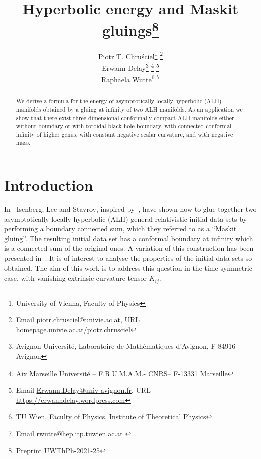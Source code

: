 \documentclass[a4paper,10pt]{article}
\newcounter{mnotecount}[section]
\renewcommand{\themnotecount}{\thesection.\arabic{mnotecount}}
\newcommand{\mnote}[1]%
{\protect{\stepcounter{mnotecount}}$^{\mbox{\footnotesize
$%
\bullet$\themnotecount}}$ \marginpar{%
\raggedright\tiny\em
$\!\!\!\!\!\!\,\bullet$\themnotecount: #1} }
\newcommand{\ptc}[1]{\mnote{{\bf ptc:}#1}}
\begin{document}
\title{Hyperbolic energy and Maskit gluings\protect\thanks{Preprint UWThPh-2021-25}}

\author{Piotr T. Chru\'{s}ciel\thanks{University of Vienna, Faculty of Physics} \thanks{
{\sc Email} \protect\url{piotr.chrusciel@univie.ac.at}, {\sc URL} \protect\url{homepage.univie.ac.at/piotr.chrusciel}}
\\
{Erwann
Delay}\thanks{ Avignon Universit\'e, Laboratoire de Math\'ematiques d'Avignon,
F-84916 Avignon}
\thanks{Aix Marseille Universit\'e -- F.R.U.M.A.M.- CNRS-- F-13331 Marseille}
 \thanks{{\sc Email} \protect\url{Erwann.Delay@univ-avignon.fr}, {\sc URL} \protect\url{https://erwanndelay.wordpress.com}}
\\
{Raphaela Wutte}\thanks{TU Wien, Faculty of Physics, Institute of Theoretical Physics}
\thanks{
{\sc Email} \protect\url{rwutte@hep.itp.tuwien.ac.at} {} \protect\url{}}
}
\maketitle

\begin{abstract}
We derive a formula for the energy of asymptotically locally hyperbolic
(ALH) manifolds obtained by a gluing at infinity of two ALH manifolds. As
an application we show that there exist three-dimensional conformally compact ALH manifolds
 either without boundary or with toroidal black hole boundary,
 with connected conformal infinity of higher genus, with constant negative scalar curvature, and
with negative mass.
\end{abstract}


\tableofcontents


\section{Introduction}

In~\cite{ILS} Isenberg, Lee and Stavrov, inspired by~\cite{MazzeoPacardMaskit}, have shown how to glue together two
asymptotically locally hyperbolic (ALH) general relativistic initial data
sets by performing a boundary connected sum, which they referred to as a
``Maskit gluing''. The resulting initial data set has a conformal
boundary at infinity which is a connected sum of the original ones. A
variation of this construction has been presented in~\cite{ChDelayExotic}. It
is of interest to analyse the properties of the initial data sets so
obtained. The aim of this work is to address this question in the time
symmetric case, with vanishing extrinsic curvature tensor $K_{ij}$.
\end{document}
